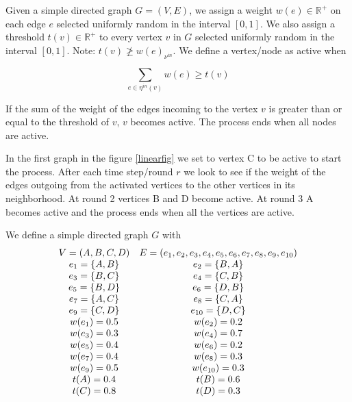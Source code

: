 Given a simple directed graph $G=(V,E)$, we assign a weight $w(e) \in \mathbb{R}^{+}$ on each edge $e$ selected uniformly random in the interval $[0,1]$. We also assign a threshold $t(v) \in \mathbb{R}^{+}$ to every vertex $v$ in $G$ selected uniformly random in the interval $[0,1]$. Note: $t(v) \not\geq w(e)_{\nu^{in}}$.
We define a vertex/node as active when

		$$\sum_{e \in \eta^{in}(v)} w(e)\geq t(v)$$

If the sum of the weight of the edges incoming to the vertex $v$ is greater than or equal to the threshold of $v$, $v$ becomes active. The process ends when all nodes are active.

In the first graph in the figure \ref{linearfig} we set to vertex C to be active to start the process. After each time step/round $r$ we look to see if the weight of the edges outgoing from the activated vertices to the other vertices in its neighborhood. At round 2 vertices B and D become active. At round 3 A becomes active and the process ends when all the vertices are active. \cite{Kempe}

We define a simple directed graph $G$ with\\

\begin{equation}
\begin{array}{c c}
V=(A,B,C,D) &
E=(e_{1},e_{2},e_{3},e_{4},e_{5},e_{6},e_{7},e_{8},e_{9},e_{10})\\
e_{1}=\{A,B\} & e_{2}=\{B,A\}\\
e_{3}=\{B,C\} & e_{4}=\{C,B\}\\
e_{5}=\{B,D\} & e_{6}=\{D,B\}\\
e_{7}=\{A,C\} & e_{8}=\{C,A\}\\
e_{9}=\{C,D\} & e_{10}=\{D,C\}\\ 
w(e_{1})=0.5 & w(e_{2})=0.2\\
w(e_{3})=0.3 & w(e_{4})=0.7\\
w(e_{5})=0.4 & w(e_{6})=0.2\\
w(e_{7})=0.4 & w(e_{8})=0.3\\
w(e_{9})=0.5 & w(e_{10})=0.3\\
t(A)=0.4 & t(B)=0.6\\
t(C)=0.8 & t(D)=0.3\\
\end{array} 
\end{equation}

